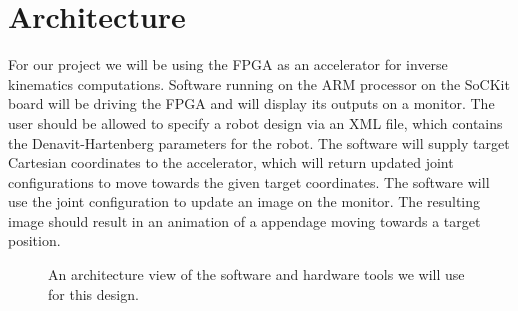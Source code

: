 \section{Architecture}
For our project we will be using the FPGA as an accelerator for
inverse kinematics computations. Software running on the ARM processor 
on the SoCKit board will be driving the FPGA and will display its outputs on 
a monitor. The user should be allowed to specify a robot design via an XML file, which contains the Denavit-Hartenberg parameters for the robot. The software will supply target Cartesian coordinates 
to the accelerator, which will return updated joint configurations to 
move towards the given target coordinates. The software will use the 
joint configuration to update an image on the monitor. The resulting 
image should result in an animation of a appendage moving towards a target 
position.

\begin{figure}[ht]
\center
{}
\caption{An architecture view of the software and hardware tools we will use for this design.}
\label{fig:toolchain}
\end{figure}